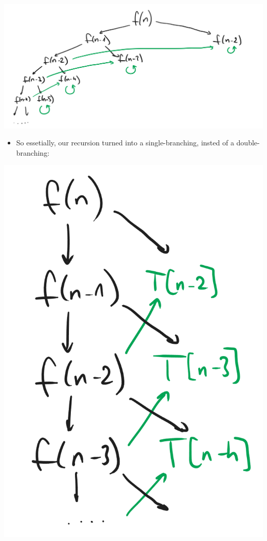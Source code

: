 \begin{center}
    \includegraphics[width=\linewidth]{10/05/fibonacci_cutoff.png}
\end{center}

\begin{itemize}
    \item So essetially, our recursion turned into a single-branching, insted of a double-branching:
\end{itemize}

\begin{center}
    \includegraphics[width=0.5\linewidth]{10/05/fibonacci_single.png}
\end{center}

